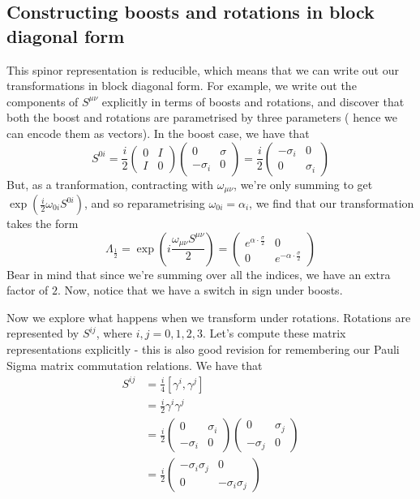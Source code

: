 \documentclass[11pt, oneside]{article}   	%
\theoremstyle{newline}
\theoremstyle{newline}
\theoremstyle{newline}
\theoremstyle{newline}
\theoremstyle{newline}
\begin{document}
\subsection{Constructing boosts and rotations in block diagonal form} 
This spinor representation is reducible, which means that we can write out our transformations in block diagonal form. For example, we write out the components of $S^{ \mu \nu } $ explicitly in terms of boosts and rotations, and discover that both the boost and rotations are parametrised by three parameters ( hence we can encode them as vectors). In the boost case, we have that \[ S^{ 0i } = \frac{ i }{2} \begin{pmatrix} 0 & I \\ I & 0 \end{pmatrix} \begin{pmatrix} 0 & \sigma \\ - \sigma_i & 0 \end{pmatrix}  = \frac{i}{2} \begin{pmatrix} - \sigma_i & 0 \\ 0 & \sigma_i \end{pmatrix} \] But, as a tranformation, contracting with $ \omega_{ \mu \nu} $, we're only summing to get $\exp ( \frac{i }{2} \omega_{ 0i }S^{ 0i } )$, and so reparametrising $\omega_{ 0i } = \alpha_i$, we find that our transformation takes the form 
\[ \Lambda_{ \frac{1}{2}}  = \exp \left(i \frac{ \omega_{ \mu \nu} S^{\mu \nu}}{2} \right)  = \begin{pmatrix} e^{ \alpha \cdot \frac{ \sigma}{2} } & 0 \\ 0 & e^{  - \alpha \cdot \frac{\sigma}{2}} \end{pmatrix} \] 
Bear in mind that since we're summing over all the indices, we have an extra factor of $2$. Now, notice that we have a switch in sign under boosts.   

Now we explore what happens when we transform under rotations. Rotations are represented by $S^{ij} $, where $i, j = 0, 1, 2, 3$. Let's compute these matrix representations explicitly - this is also good revision for remembering our Pauli Sigma matrix commutation relations. We have that 
\begin{align*} 
S^{ij}  & = \frac{ i}{4} [\gamma^i, \gamma^j ] \\ 
& = \frac{ i}{ 2} \gamma^i \gamma^j \\
& = \frac{ i}{2} \begin{pmatrix} 0 & \sigma_i \\ - \sigma_i & 0 \end{pmatrix} \begin{pmatrix} 0 & \sigma_j \\ - \sigma_j & 0 \end{pmatrix} \\ 
&= \frac{i}{2} \begin{pmatrix}  - \sigma_i \sigma_j & 0 \\ 0 &  - \sigma_i  \sigma_j \end{pmatrix} 
\end{align*} 
\end{document}
